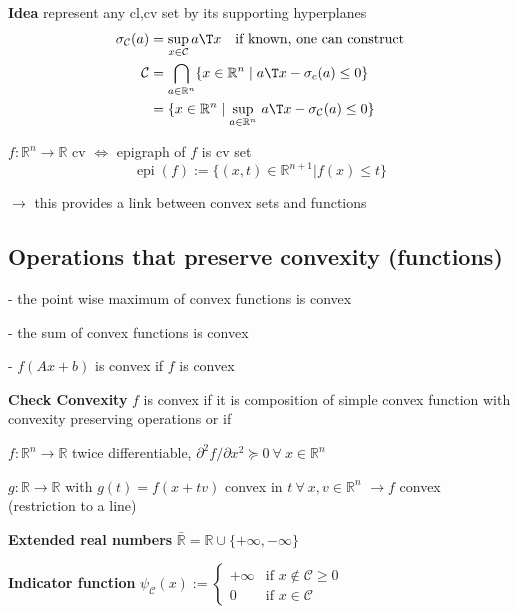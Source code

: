 \textbf{Idea} represent any cl,cv set by its supporting hyperplanes
\[\begin{aligned}
		\sigma_\mathcal{C}(a) & = \sup_{x \in \mathcal{C}}a\T x
		\quad\text{if known, one can construct}                                                                                                        \\
		\mathcal{C}           & = \bigcap_{a \in \mathbb{R}^n} \{x \in \mathbb{R}^n \mid a\T x - \sigma_c(a) \leq 0\}                                  \\
		                      & = \{x \in \mathbb{R}^n \mid \underset{a \in \mathbb{R}^{n}}{\operatorname{sup}}\ a\T x - \sigma_\mathcal{C}(a) \le 0\}
	\end{aligned}\]

\begin{definition}
	$f:\mathbb{R}^n \rightarrow \mathbb{R}$ cv
	$\Leftrightarrow$
	epigraph of $f$ is cv set
	$$\operatorname{epi}(f):=\{(x,t)\in \mathbb{R}^{n+1} | f(x)\le t\}$$
\end{definition}

$\rightarrow$ this provides a link between convex sets and functions

\subsection{Operations that preserve convexity (functions)}

- the point wise maximum of convex functions is convex

- the sum of convex functions is convex

- $f(Ax+b)$ is convex if $f$ is convex

\textbf{Check Convexity} $f$ is convex if it is
composition of simple convex function
with convexity preserving operations
or if

$f: \mathbb{R}^n \rightarrow \mathbb{R}$ twice differentiable,
$\partial^2f/\partial x^2 \succeq 0\ \forall\ x \in \mathbb{R}^{n}$

$g: \mathbb{R} \rightarrow \mathbb{R}$ with $g(t)=f(x+tv)$
convex in $t\ \forall\ x,v \in \mathbb{R}^{n}$
$\rightarrow f$ convex (restriction to a line)

\textbf{Extended real numbers} $\bar{\mathbb{R}} = \mathbb{R} \cup \{+\infty, -\infty\}$

\textbf{Indicator function}
$\psi_\mathcal{C}(x) := \begin{cases} +\infty &\text{if } x \notin\mathcal{C} \ge 0 \\ 0 &\text{if } x \in\mathcal{C} \end{cases}$

